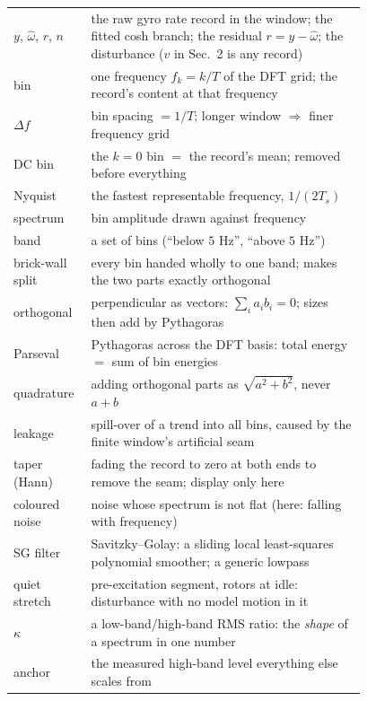\documentclass[10pt]{article}
\begin{document}
\begin{center}\small
\begin{tabular}{@{}lp{0.78\linewidth}@{}}
\toprule
$y$, $\hat\omega$, $r$, $n$ & the raw gyro rate record in the window;
      the fitted cosh branch; the residual $r = y - \hat\omega$;
      the disturbance ($v$ in Sec.~2 is any record)\\
bin & one frequency $f_k = k/T$ of the DFT grid; the record's
      content at that frequency\\
$\Delta f$ & bin spacing $= 1/T$; longer window $\Rightarrow$ finer
      frequency grid\\
DC bin & the $k=0$ bin $=$ the record's mean; removed before
      everything\\
Nyquist & the fastest representable frequency, $1/(2T_s)$\\
spectrum & bin amplitude drawn against frequency\\
band & a set of bins (``below $5$ Hz'', ``above $5$ Hz'')\\
brick-wall split & every bin handed wholly to one band; makes the two
      parts exactly orthogonal\\
orthogonal & perpendicular as vectors: $\sum_i a_ib_i = 0$; sizes
      then add by Pythagoras\\
Parseval & Pythagoras across the DFT basis: total energy $=$ sum of
      bin energies\\
quadrature & adding orthogonal parts as $\sqrt{a^2+b^2}$, never
      $a+b$\\
leakage & spill-over of a trend into all bins, caused by the
      finite window's artificial seam\\
taper (Hann) & fading the record to zero at both ends to remove the
      seam; display only here\\
coloured noise & noise whose spectrum is not flat (here: falling
      with frequency)\\
SG filter & Savitzky--Golay: a sliding local least-squares
      polynomial smoother; a generic lowpass\\
quiet stretch & pre-excitation segment, rotors at idle: disturbance
      with no model motion in it\\
$\kappa$ & a low-band/high-band RMS ratio: the \emph{shape} of a
      spectrum in one number\\
anchor & the measured high-band level everything else scales
      from\\
\bottomrule
\end{tabular}
\end{center}
\end{document}
